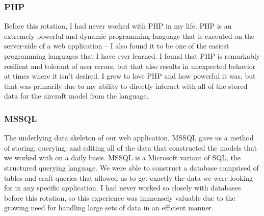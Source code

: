 \documentclass{article}
\begin{document}
\subsubsection{PHP}
Before this rotation, I had never worked with PHP in my life. PHP is an extremely powerful and dynamic programming language that is executed on the server-side of a web application -- I also found it to be one of the easiest programming languages that I have ever learned. I found that PHP is remarkably resilient and tolerant of user errors, but that also results in unexpected behavior at times where it isn't desired. I grew to love PHP and how powerful it was, but that was primarily due to my ability to directly interact with all of the stored data for the aircraft model from the language.
\subsubsection{MSSQL}
The underlying data skeleton of our web application, MSSQL gave us a method of storing, querying, and editing all of the data that constructed the models that we worked with on a daily basis. MSSQL is a Microsoft variant of SQL, the structured querying language. We were able to construct a database comprised of tables and craft queries that allowed us to get exactly the data we were looking for in any specific application. I had never worked so closely with databases before this rotation, so this experience was immensely valuable due to the growing need for handling large sets of data in an efficient manner.

\end{document}
